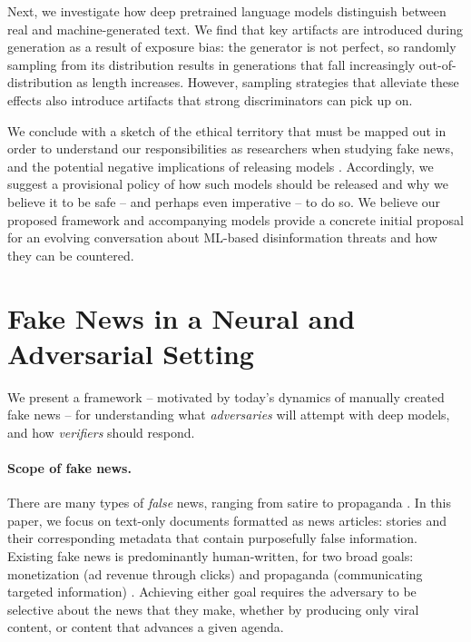 \documentclass{article}
\begin{document}
Next, we investigate how deep pretrained language models distinguish between real and machine-generated text. We find that key artifacts are introduced during generation as a result of exposure bias: the generator is not perfect, so randomly sampling from its distribution results in generations that fall increasingly out-of-distribution as length increases. However, sampling strategies that alleviate these effects also introduce artifacts that strong discriminators can pick up on.

We conclude with a sketch of the ethical territory that must be mapped out in order to understand our responsibilities as researchers when studying fake news, and the potential negative implications of releasing models \citep{hecht2018s, zellers2019whywereleasedgrover, solaiman2019release}.
Accordingly, we suggest a provisional policy of how such models should be released and why we believe it to be safe  -- and perhaps even imperative -- to do so.  We believe our proposed framework and accompanying models provide a concrete initial proposal for an evolving conversation about ML-based disinformation threats and how they can be countered. 
\section{Fake News in a Neural and Adversarial Setting}
\label{sec:overview}
We present a framework -- motivated by today's dynamics of manually created fake news -- for understanding what \emph{adversaries} will attempt with deep models, and how \emph{verifiers} should respond.

\paragraph{Scope of fake news.}
There are many types of \emph{false} news, ranging from satire to propaganda \citep{wardle2017fake}. In this paper, we focus on text-only documents formatted as news articles: stories and their corresponding metadata that contain purposefully false information.
Existing fake news is predominantly human-written, for two broad goals: monetization (ad revenue through clicks) and propaganda (communicating targeted information)  \citep{bradshaw2017troops, melford2019disinfo}. Achieving either goal requires the adversary to be selective about the news that they make, whether by producing only viral content, or content that advances a given agenda.
\end{document}

